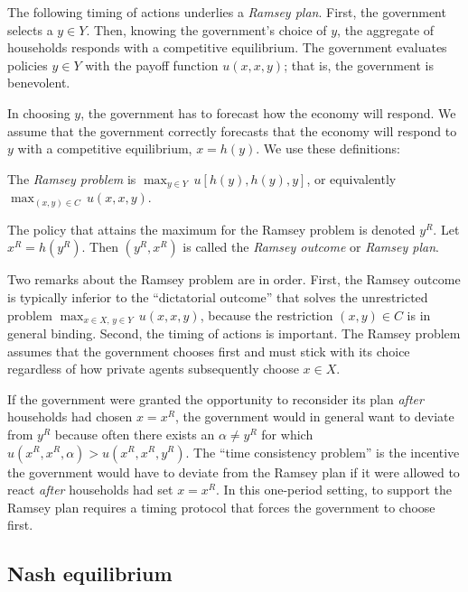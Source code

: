  The following timing of actions underlies a {\it Ramsey plan}.
First, the government selects a $y\in Y$.  Then, knowing the
government's choice of  $y$, the aggregate of households responds with
a competitive equilibrium.  The government evaluates policies
$y\in Y$ with the payoff function $u(x,x,y)$; that is,
the government is benevolent.

In choosing $y$, the government has to forecast how
the economy will respond.  We assume that the government correctly forecasts
 that the economy will respond to $y$ with a competitive
equilibrium, $x=h(y)$.  We use these definitions:

\medskip   {}
  The {\it Ramsey problem\/}
is $\max_{y\in Y}\, u[h(y),
h(y), y]$, or equivalently
$\max_{(x,y)\in C}\, u(x,x,y)$.

\medskip   {}
 The policy that attains the maximum for the Ramsey problem
is denoted $y^R$.  Let
$x^R=h(y^R)$.  Then
$(y^R,x^R)$ is called the
{\it Ramsey outcome\/} or {\it Ramsey plan}.

\medskip

Two remarks about the Ramsey problem are in order.  First, the Ramsey
outcome is typically inferior to the ``dictatorial outcome'' that
solves the unrestricted problem $\max_{x\in X,\,y\in Y}\, u(x,x,y)$,
because the restriction $(x,y)\in C$ is in general
binding.  Second, the timing of actions is important.
The Ramsey problem assumes that the government chooses first and must  stick with its choice
regardless of how private agents subsequently choose $x \in X$.

If the government were granted the opportunity to reconsider its plan
{\it after\/} households had chosen $x=x^R$, the government would in general want to
deviate from $y^R$ because often there exists
an $\alpha \not= y^R$ for which $u(x^R,x^R,\alpha)> u(x^R,x^R,y^R)$.
The ``time consistency problem'' is the incentive the government  would have
to deviate from
the Ramsey plan if it  were allowed to react {\it after\/} households had set $x=x^R$.
In this one-period setting, to support the Ramsey plan requires
a timing protocol that forces the government to choose first.
\subsection{Nash equilibrium}

